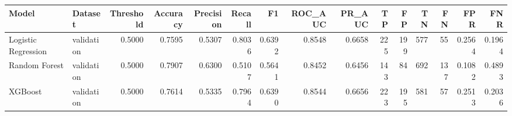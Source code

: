 \begin{tabular}{llrrrrrrrrrrrrr}
\toprule
Model & Dataset & Threshold & Accuracy & Precision & Recall & F1 & ROC_AUC & PR_AUC & TP & FP & TN & FN & FPR & FNR \\
\midrule
Logistic Regression & validation & 0.5000 & 0.7595 & 0.5307 & 0.8036 & 0.6392 & 0.8548 & 0.6658 & 225 & 199 & 577 & 55 & 0.2564 & 0.1964 \\
Random Forest & validation & 0.5000 & 0.7907 & 0.6300 & 0.5107 & 0.5641 & 0.8452 & 0.6456 & 143 & 84 & 692 & 137 & 0.1082 & 0.4893 \\
XGBoost & validation & 0.5000 & 0.7614 & 0.5335 & 0.7964 & 0.6390 & 0.8544 & 0.6656 & 223 & 195 & 581 & 57 & 0.2513 & 0.2036 \\
\bottomrule
\end{tabular}
